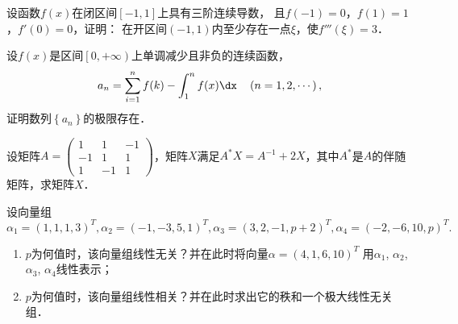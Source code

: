 \documentclass[plain,noanswer,medmath]{../../template/jnuexam}
\begin{document}

\begin{problem}
设函数$f(x)$在闭区间$\left[- 1,1 \right]$上具有三阶连续导数，
且$f(- 1) = 0$，$f(1) = 1$，$f'(0) = 0$，证明：
在开区间$\left(- 1,1 \right)$内至少存在一点$\xi$，使$f'''\left(\xi \right) = 3$．
\end{problem}






\begin{problem}
设$f(x)$是区间$\left[0, +\infty \right)$上单调减少且非负的连续函数，
$$a_n = \sum_{i = 1}^n f(k) - \int_1^n f(x)\dx\quad \left(n = 1,2, \cdots \right),$$
证明数列$\left\{a_n \right\}$的极限存在．
\end{problem}



\begin{problem}
设矩阵$A = \begin{pmatrix}
   1 &  1 & -1 \\
  -1 &  1 & 1 \\
   1 & -1 & 1
\end{pmatrix}$，矩阵$X$满足$A^* X = A^{-1} + 2X$，其中$A^*$是$A$的伴随矩阵，求矩阵$X$．
\end{problem}



\begin{problem}
设向量组
$$\alpha_1=(1,1,1,3)^T, \alpha_2=(-1,-3,5,1)^T,
  \alpha_3=(3,2,-1,p+2)^T, \alpha_4=(-2,-6,10,p)^T.$$
\begin{enumerate}
\item $p$为何值时，该向量组线性无关？并在此时将向量$\alpha = \left(4,1,6,10 \right)^T$
      用$\alpha_1$, $\alpha_2$, $\alpha_3$, $\alpha_4$线性表示；
\item $p$为何值时，该向量组线性相关？并在此时求出它的秩和一个极大线性无关组．
\end{enumerate}
\end{problem}
\end{document}
